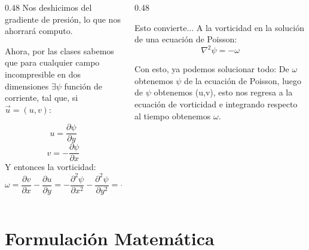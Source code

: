 \documentclass[aspectratio=169, 12pt]{beamer}
\begin{document}
\begin{frame}
  \begin{columns}
    \begin{column}{0.48\textwidth}
      Nos deshicimos del gradiente de presión, lo que nos ahorrará computo.

      Ahora, por las clases sabemos que para cualquier campo incompresible en dos dimensiones $\exists\psi $ función de corriente, tal que, si $\vec{u} = (u, v)$:

    $$u =  \frac{\partial\psi}{\partial y} $$
    $$v = - \frac{\partial\psi}{\partial x} $$
    Y entonces la vorticidad:
    $$\omega = \frac{\partial v}{\partial x} - \frac{\partial u}{\partial y} = -\frac{\partial^2 \psi}{\partial x^2} - \frac{\partial^2 \psi}{\partial y^2} = - \nabla^2\psi$$
    \end{column}
    \begin{column}{0.48\textwidth}
      \begin{block}{Esto convierte...}
        A la vorticidad en la solución  de una ecuación de Poisson:
        $$\nabla^2\psi=-\omega$$
      \end{block}
      Con esto, ya podemos solucionar todo:
      De $\omega$ obtenemos $\psi$ de la ecuación de Poisson, luego de $\psi$ obtenemos (u,v), esto nos regresa a la ecuación de vorticidad e integrando respecto al tiempo obtenemos $\omega$. 
    \end{column}
  \end{columns}
\end{frame}

\section{Formulación Matemática}
\end{document}
